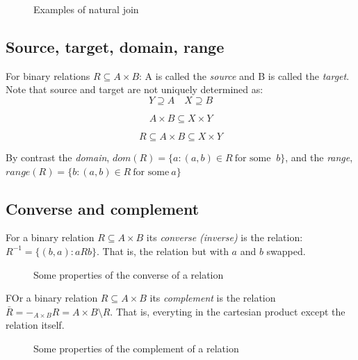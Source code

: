 \documentclass[12pt]{article} %
\begin{document}
\begin{figure}[H]
\caption{Examples of natural join}
\label{Natural join example}
\end{figure}

\subsection{Source, target, domain, range}
For binary relations $R \subseteq A \times B$: A is called the \textit{source} and B is called the \textit{target}. Note that source and target are not uniquely determined as:
\[
    Y \supseteq A \quad X \supseteq B
\]

\[
    A \times B \subseteq X \times Y 
\]

\[
    R \subseteq A \times B \subseteq X \times Y
\]

By contrast the \textit{domain}, $dom(R) = \{a : (a,b) \in R \ \textrm{for some } \ b\}$, and the \textit{range}, $range(R) = \{b : (a,b) \in R \ \textrm{for some} \ a\}$


\subsection{Converse and complement}
For a binary relation $R \subseteq A \times B$ its \textit{converse (inverse)} is the relation: $R^{-1} = \{(b,a) : aRb\}$. That is, the relation but with $a$ and $b$ swapped.

\begin{figure}[H]
\caption{Some properties of the converse of a relation}
\label{Converse properties}
\end{figure}

FOr a binary relation $R \subseteq A \times B$ its \textit{complement} is the relation $\bar{R} = -_{A \times B}R = A \times B \setminus R$. That is, everyting in the cartesian product except the relation itself.

\begin{figure}[H]
\caption{Some properties of the complement of a relation}
\label{Conplement properties}
\end{figure}
\end{document}
